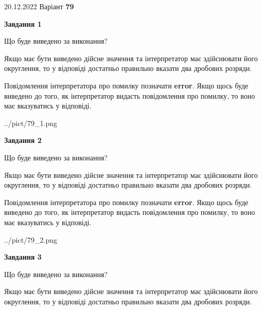 \documentclass[12pt, ukrainian]{article}
\begin{document}
{20.12.2022 Варіант \No \textbf { 79 }\par}
{
\begin {Large}

{\begin {center}\textbf{Завдання 1}\end {center}}\par
Що буде виведено за виконання? \par

Якщо має бути виведено дійсне значення та інтерпретатор має здійснювати його округлення, 
то у відповіді достатньо правильно вказати два дробових розряди.

Повідомлення інтерпретатора про помилку позначати \textbf{error}.
Якщо щось буде виведено до того, як інтерпретатор видасть повідомлення про помилку, 
то воно має вказуватись у відповіді. \par

\begin{center}
	{../pict/79_1.png}
\end{center}
\newpage

{\begin {center}\textbf{Завдання 2}\end {center}}\par
Що буде виведено за виконання? \par

Якщо має бути виведено дійсне значення та інтерпретатор має здійснювати його округлення, 
то у відповіді достатньо правильно вказати два дробових розряди.

Повідомлення інтерпретатора про помилку позначати \textbf{error}.
Якщо щось буде виведено до того, як інтерпретатор видасть повідомлення про помилку, 
то воно має вказуватись у відповіді. \par

\begin{center}
	{../pict/79_2.png}
\end{center}
\newpage

{\begin {center}\textbf{Завдання 3}\end {center}}\par
Що буде виведено за виконання? \par

Якщо має бути виведено дійсне значення та інтерпретатор має здійснювати його округлення, 
то у відповіді достатньо правильно вказати два дробових розряди.


\end{Large}}
\end{document}
